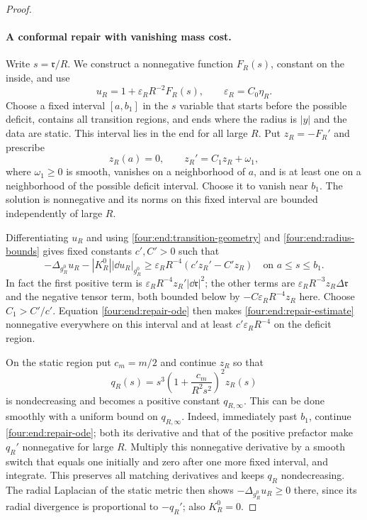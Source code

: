 \begin{proof}
\paragraph{A conformal repair with vanishing mass cost.}
Write \(s=\mathfrak r/R\). We construct a nonnegative function
\(F_R(s)\), constant on the inside, and use
\[
 u_R=1+\varepsilon_RR^{-2}F_R(s),\qquad
 \varepsilon_R=C_0\eta_R.
\]
Choose a fixed interval \([a,b_1]\) in the \(s\) variable that starts
before the possible deficit, contains all transition regions, and ends
where the radius is \(|y|\) and the data are static. This interval lies
in the end for all large \(R\). Put \(z_R=-F_R'\) and prescribe
\begin{equation}\label{four:end:repair-ode}
 z_R(a)=0,\qquad z_R'=C_1z_R+\omega_1,
\end{equation}
where \(\omega_1\ge0\) is smooth, vanishes on a neighborhood of \(a\),
and is at least one on a neighborhood of the possible deficit interval.
Choose it to vanish near \(b_1\). The solution is nonnegative and its
norms on this fixed interval are bounded independently of large \(R\).

Differentiating \(u_R\) and using \eqref{four:end:transition-geometry} and
\eqref{four:end:radius-bounds} gives fixed constants \(c',C'>0\) such that
\begin{equation}\label{four:end:repair-estimate}
 -\Delta_{g_R^0}u_R-|K_R^0||\dd u_R|_{g_R^0}
 \ge\varepsilon_RR^{-4}(c'z_R'-C'z_R)
 \quad\text{on }a\le s\le b_1.
\end{equation}
In fact the first positive term is
\(\varepsilon_RR^{-4}z_R'|\dd\mathfrak r|^2\); the other terms are
\(\varepsilon_RR^{-3}z_R\Delta\mathfrak r\) and the negative tensor
term, both bounded below by \(-C\varepsilon_RR^{-4}z_R\) here.
Choose \(C_1>C'/c'\). Equation \eqref{four:end:repair-ode} then makes
\eqref{four:end:repair-estimate} nonnegative everywhere on this interval
and at least \(c'\varepsilon_RR^{-4}\) on the deficit region.

On the static region put \(c_m=m/2\) and continue \(z_R\) so that
\[
 q_R(s)=s^3\left(1+\frac{c_m}{R^2s^2}\right)^2z_R(s)
\]
is nondecreasing and becomes a positive constant \(q_{R,\infty}\).
This can be done smoothly with a uniform bound on \(q_{R,\infty}\).
Indeed, immediately past \(b_1\), continue \eqref{four:end:repair-ode};
both its derivative and that of the positive prefactor make \(q_R'\)
nonnegative for large \(R\). Multiply this nonnegative derivative by
a smooth switch that equals one initially and zero after one more fixed
interval, and integrate. This preserves all matching derivatives and
keeps \(q_R\) nondecreasing. The radial Laplacian of the static metric
then shows \(-\Delta_{g_R^0}u_R\ge0\) there, since its radial divergence
is proportional to \(-q_R'\); also \(K_R^0=0\).


\end{proof}
